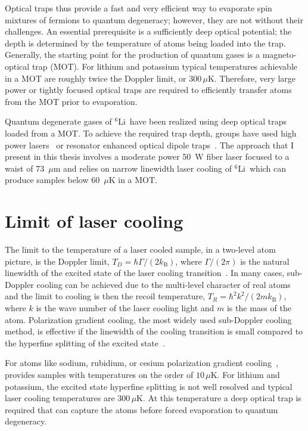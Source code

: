 \documentclass[oneside,12pt]{memoir}
\newcommand{\TD}{\ensuremath{ T_{D} }}
\newcommand{\TR}{\ensuremath{ T_{R} }}
\newcommand{\li} {\ensuremath{^{6}}Li\ }
\newcommand{\kb} { \ensuremath{k_{\mathrm{B}}}}
\begin{document}
Optical traps thus provide a fast and very efficient way to evaporate spin
mixtures of fermions to quantum degeneracy;  however, they are not without
their challenges.   An essential prerequisite is a sufficiently deep optical
potential; the depth is determined by the temperature of atoms being loaded
into the trap.   Generally, the starting point for the production of quantum
gases is a magneto-optical trap (MOT).   For lithium and potassium  typical
temperatures achievable in a MOT are roughly twice the Doppler limit, or $300
\,\mu$K. Therefore, very large power or tightly focused optical traps are
required to efficiently transfer atoms from the MOT prior to evaporation.  

Quantum degenerate gases of \li have been realized using deep optical traps
loaded from a MOT.  To achieve the required trap depth, groups have used high
power lasers~\cite{O'Hara2002} or  resonator enhanced optical dipole
traps~\cite{Jochim2003}.  The approach that I present in this thesis involves a
moderate power 50~W fiber laser focused to a waist of 73~$\mu$m and relies on
narrow linewidth laser cooling of \li which can produce samples below 60~$\mu$K
in a MOT.

\section{Limit of laser cooling} 

The limit to the temperature of a laser cooled sample, in a two-level atom
picture, is the Doppler limit,  $\TD=\hbar\Gamma/(2\kb)$, where $\Gamma/(2\pi)$
is the natural linewidth of the excited state of the laser cooling
transition~\cite{Hansch1975,Wineland1975}.  In many cases, sub-Doppler cooling
can be achieved due to the multi-level character of real atoms and the limit to
cooling is then the recoil temperature, $\TR=\hbar^{2} k^{2}/ (2 m \kb)$, where
$k$ is the wave number of the laser cooling light and $m$ is the mass of the
atom. Polarization gradient cooling, the most widely used sub-Doppler cooling
method, is effective if the linewidth of the cooling transition is small
compared to the hyperfine splitting of the excited
state~\cite{Dalibard1989,Ungar1989,Weiss1989,Lett1989}.



For atoms like sodium, rubidium, or cesium polarization gradient
cooling~\cite{Dalibard1989,Ungar1989,Weiss1989,Lett1989}, provides samples with
temperatures on the order of $10 \,\mu$K.  For lithium and potassium, the
excited state hyperfine splitting is not well resolved and typical laser
cooling temperatures are $300 \,\mu$K.  At this temperature a deep optical trap
is required that can capture the atoms before forced evaporation to quantum
degeneracy. 
\end{document}
